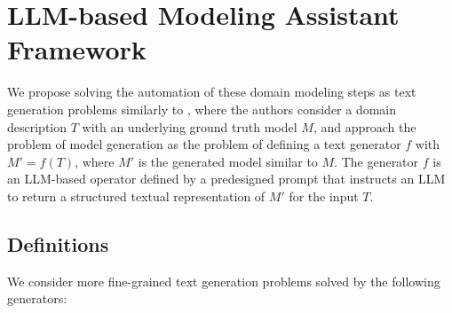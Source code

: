 \chapter{LLM-based Modeling Assistant Framework}

We propose solving the automation of these domain modeling steps as text generation problems similarly to \citet{Chen2023}, where the authors consider a domain description $T$ with an underlying ground truth model $M$, and approach the problem of model generation as the problem of defining a text generator $f$ with $M' = f(T)$, where $M'$ is the generated model similar to $M$. The generator $f$ is an LLM-based operator defined by a predesigned prompt that instructs an LLM to return a structured textual representation of $M'$ for the input $T$.


\section{Definitions}

We consider more fine-grained text generation problems solved by the following generators:

